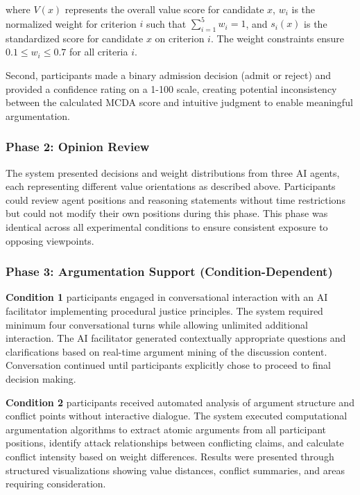 \documentclass[conference]{IEEEtran}
\begin{document}
where $V(x)$ represents the overall value score for candidate $x$, $w_i$ is the normalized weight for criterion $i$ such that $\sum_{i=1}^{5} w_i = 1$, and $s_i(x)$ is the standardized score for candidate $x$ on criterion $i$. The weight constraints ensure $0.1 \leq w_i \leq 0.7$ for all criteria $i$.

Second, participants made a binary admission decision (admit or reject) and provided a confidence rating on a 1-100 scale, creating potential inconsistency between the calculated MCDA score and intuitive judgment to enable meaningful argumentation.

\subsubsection{Phase 2: Opinion Review}

The system presented decisions and weight distributions from three AI agents, each representing different value orientations as described above. Participants could review agent positions and reasoning statements without time restrictions but could not modify their own positions during this phase. This phase was identical across all experimental conditions to ensure consistent exposure to opposing viewpoints.

\subsubsection{Phase 3: Argumentation Support (Condition-Dependent)}

\textbf{Condition 1} participants engaged in conversational interaction with an AI facilitator implementing procedural justice principles. The system required minimum four conversational turns while allowing unlimited additional interaction. The AI facilitator generated contextually appropriate questions and clarifications based on real-time argument mining of the discussion content. Conversation continued until participants explicitly chose to proceed to final decision making.

\textbf{Condition 2} participants received automated analysis of argument structure and conflict points without interactive dialogue. The system executed computational argumentation algorithms to extract atomic arguments from all participant positions, identify attack relationships between conflicting claims, and calculate conflict intensity based on weight differences. Results were presented through structured visualizations showing value distances, conflict summaries, and areas requiring consideration.
\end{document}
